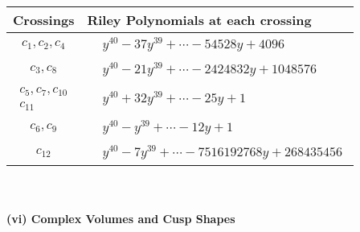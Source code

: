 \documentclass[1p]{elsarticle_modified}
\theoremstyle{definition}
\begin{document}
\begin{tabular}{m{50pt}|m{274pt}}
Crossings & \hspace{64pt}Riley Polynomials at each crossing \\
\hline $$\begin{aligned}c_{1},c_{2},c_{4}\end{aligned}$$&$\begin{aligned}
&y^{40}-37 y^{39}+\cdots-54528 y+4096
\end{aligned}$\\
\hline $$\begin{aligned}c_{3},c_{8}\end{aligned}$$&$\begin{aligned}
&y^{40}-21 y^{39}+\cdots-2424832 y+1048576
\end{aligned}$\\
\hline $$\begin{aligned}c_{5},c_{7},c_{10}\\c_{11}\end{aligned}$$&$\begin{aligned}
&y^{40}+32 y^{39}+\cdots-25 y+1
\end{aligned}$\\
\hline $$\begin{aligned}c_{6},c_{9}\end{aligned}$$&$\begin{aligned}
&y^{40}- y^{39}+\cdots-12 y+1
\end{aligned}$\\
\hline $$\begin{aligned}c_{12}\end{aligned}$$&$\begin{aligned}
&y^{40}-7 y^{39}+\cdots-7516192768 y+268435456
\end{aligned}$\\
\hline
\end{tabular}\\~\\
\newpage\flushleft \textbf{(vi) Complex Volumes and Cusp Shapes}
\end{document}
